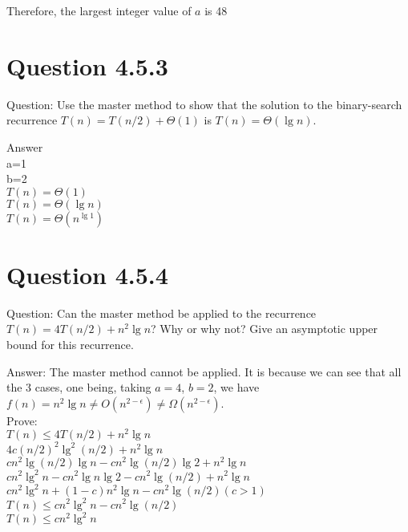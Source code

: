 \documentclass[12pt]{article}
\begin{document}
Therefore, the largest integer value of $a$ is 48


\section{Question 4.5.3}

Question: Use the master method to show that the solution to the binary-search recurrence $T(n) = T(n / 2) + \Theta(1)$ is $T(n) = \Theta(\lg n)$.

Answer\\
a=1\\
b=2\\
$T(n)=\Theta(1)$ \\
$T(n) = \Theta(\lg n)$ \\
$T(n)=\Theta(n^{\lg 1})$\\


\section{Question 4.5.4}
Question: Can the master method be applied to the recurrence $T(n) = 4T(n / 2) + n^2\lg n$? Why or why not? Give an asymptotic upper bound for this recurrence.

Answer: The master method cannot be applied. It is because we can see that all the 3 cases, one being, taking $a = 4$, $b = 2$, we have $f(n) = n^2\lg n \ne O(n^{2 - \epsilon}) \ne \Omega(n^{2 - \epsilon})$.\\

Prove: \\
$T(n) \le 4T(n / 2) + n^2\lg n $\\
$4c(n / 2)^2\lg^2(n / 2) + n^2\lg n$\\
$ cn^2\lg(n / 2)\lg n - cn^2\lg(n / 2)\lg 2 + n^2\lg n$\\
$ cn^2\lg^2 n - cn^2\lg n\lg 2 - cn^2\lg(n / 2) + n^2\lg n$\\
$cn^2\lg^2 n + (1 - c)n^2\lg n - cn^2\lg(n / 2)(c > 1)$\\
$T(n)\le cn^2\lg^2 n - cn^2\lg(n / 2)$\\
$T(n)\le cn^2\lg^2 n$\\
\end{document}
